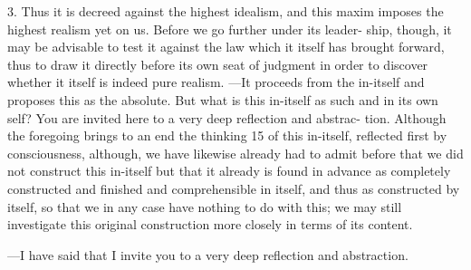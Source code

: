 3. Thus it is decreed against the highest idealism,
and this maxim imposes the highest realism yet on us.
Before we go further under its leader-
ship, though, it may be advisable to test it against the law which it itself has
brought forward, thus to draw it directly before its own seat of judgment in
order to discover whether it itself is indeed pure realism.
—It proceeds from
the in-itself and proposes this as the absolute.
But what is this in-itself as such
and in its own self? You are invited here to a very deep reflection and abstrac-
tion.
Although the foregoing brings to an end the thinking 15 of this in-itself,
reflected first by consciousness, although, we have likewise already had to
admit before that we did not construct this in-itself but that it already is found
in advance as completely constructed and finished and comprehensible in
itself, and thus as constructed by itself, so that we in any case have nothing to
do with this; we may still investigate this original construction more closely in
terms of its content.

—I have said that I invite you to a very deep reflection and abstraction.

